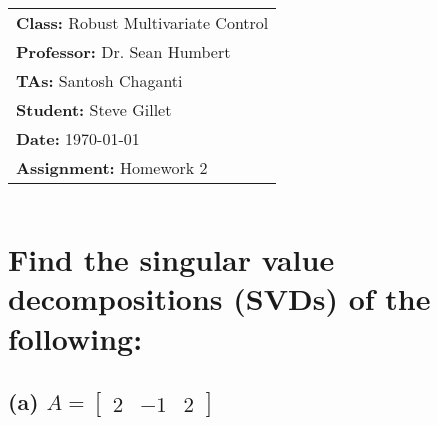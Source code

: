 \documentclass[12pt, letterpaper]{article}
\begin{document}
\title{
    \begin{tabular}{@{}l@{}}
        \textbf{Class:} Robust Multivariate Control \\
        \textbf{Professor:} Dr. Sean Humbert \\
        \textbf{TAs:} Santosh Chaganti \\
        \textbf{Student:} Steve Gillet \\
        \textbf{Date:} \today \\
        \textbf{Assignment:} Homework 2
    \end{tabular}
}

\author{}
\date{}

\maketitle

\section{Find the singular value decompositions (SVDs) of the following:}
\subsection*{(a) $A = \begin{bmatrix} 2 & -1 & 2 \end{bmatrix}$}
\end{document}
